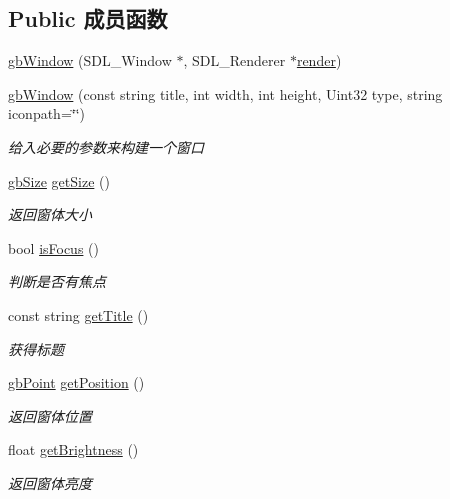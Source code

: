 \subsection*{Public 成员函数}
\begin{DoxyCompactItemize}
\item 
\mbox{\hyperlink{classgb_window_adc2896dea024e21231f0c775f5a7edda}{gb\+Window}} (S\+D\+L\+\_\+\+Window $\ast$, S\+D\+L\+\_\+\+Renderer $\ast$\mbox{\hyperlink{classgb_window_a8b83d44addf7721bb1c419dfdcd105ad}{render}})
\item 
\mbox{\hyperlink{classgb_window_a47e8d87e8905b3e7a126d3b1f3bfe66d}{gb\+Window}} (const string title, int width, int height, Uint32 type, string iconpath=\char`\"{}\char`\"{})
\begin{DoxyCompactList}\small\item\em 给入必要的参数来构建一个窗口 \end{DoxyCompactList}\item 
\mbox{\hyperlink{classgb_size}{gb\+Size}} \mbox{\hyperlink{classgb_window_af329e62282ec4ed7184eb8c58d7f7809}{get\+Size}} ()
\begin{DoxyCompactList}\small\item\em 返回窗体大小 \end{DoxyCompactList}\item 
bool \mbox{\hyperlink{classgb_window_a2e2392232e1ddb4ee301dc8069ab6230}{is\+Focus}} ()
\begin{DoxyCompactList}\small\item\em 判断是否有焦点 \end{DoxyCompactList}\item 
const string \mbox{\hyperlink{classgb_window_a42dac83ea2862f0e5277eaf1df4bf740}{get\+Title}} ()
\begin{DoxyCompactList}\small\item\em 获得标题 \end{DoxyCompactList}\item 
\mbox{\hyperlink{classgb_point}{gb\+Point}} \mbox{\hyperlink{classgb_window_acf7f12b75b0b9b3f25105569f77e8f80}{get\+Position}} ()
\begin{DoxyCompactList}\small\item\em 返回窗体位置 \end{DoxyCompactList}\item 
float \mbox{\hyperlink{classgb_window_aa5a6dbbedb1b0421c5ce41753df71ba3}{get\+Brightness}} ()
\begin{DoxyCompactList}\small\item\em 返回窗体亮度 \end{DoxyCompactList}\item 

\end{DoxyCompactItemize}
